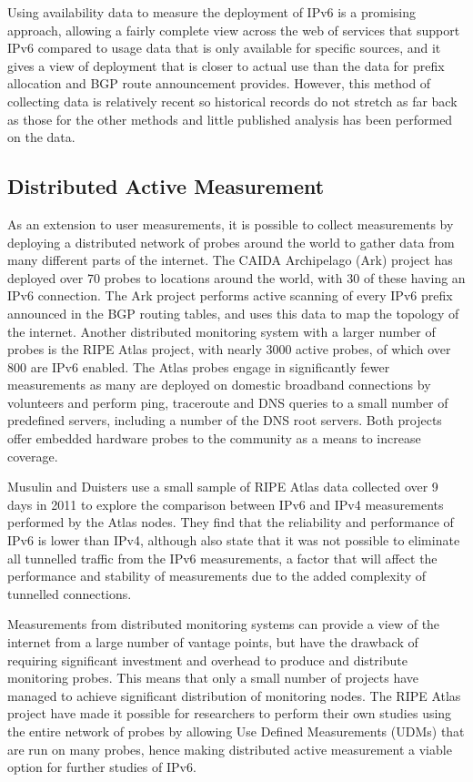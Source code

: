 Using availability data to measure the deployment of IPv6 is a promising
approach, allowing a fairly complete view across the web of services that
support IPv6 compared to usage data that is only available for specific sources,
and it gives a view of deployment that is closer to actual use than the data for
prefix allocation and BGP route announcement provides. However, this method of
collecting data is relatively recent so historical records do not stretch as far
back as those for the other methods and little published
analysis has been performed on the data.

\subsection{Distributed Active Measurement}

As an extension to user measurements, it is possible to collect measurements by
deploying a distributed network of probes around the world to
gather data from many different parts of the internet. The CAIDA
Archipelago (Ark)
project has deployed over 70 probes to locations around the world, with 30 of these
having an IPv6 connection\cite{caida_archipelago_2013}. The Ark project performs active scanning of every
IPv6 prefix announced in the BGP routing tables, and uses this data to map the
topology of the internet. Another distributed monitoring system with a
larger number of probes is the RIPE Atlas project, with nearly 3000 active
probes, of which over 800 are IPv6 enabled\cite{ripe_ncc_ripe_2013}. The Atlas probes engage in
significantly fewer measurements as many are deployed on domestic
broadband connections by volunteers and perform ping, traceroute and DNS
queries to a small number of predefined servers, including a number of the DNS
root servers. Both projects offer embedded hardware probes to the community as a
means to increase coverage.

Musulin and Duisters use a small sample of RIPE Atlas data collected over 9 days
in 2011 to explore the comparison between IPv6 and IPv4 measurements performed
by the Atlas nodes\cite{musulin_analysis_2011}. They find that the reliability and performance of IPv6 is
lower than IPv4, although also state that it was not possible to eliminate all
tunnelled traffic from the IPv6 measurements, a factor that will affect the
performance and stability of measurements due to the added complexity of
tunnelled connections. 

Measurements from distributed monitoring systems can provide a view of the
internet from a large number of vantage points, but have the drawback of
requiring significant investment and overhead to produce and distribute
monitoring probes. This means that only a small number of projects
have managed to achieve significant distribution of monitoring nodes. The
RIPE Atlas project have made it possible for researchers to perform their own
studies using the entire network of probes by allowing Use Defined Measurements
(UDMs) that are run on many probes\cite{ripe_ncc_user-defined_????}, hence making distributed active
measurement a viable option for further studies of IPv6.





